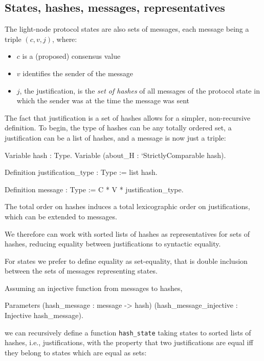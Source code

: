 \subsection{States, hashes, messages, representatives}

The light-node protocol states are also sets of messages,
each message being a triple $(c, v, j)$, where:
\begin{itemize}
    \item $c$ is a (proposed) consensus value
    \item $v$ identifies the sender of the message
    \item $j$, the justification, is the {\em set of hashes} of all messages
        of the protocol state in which the sender was at the time the message
        was sent
\end{itemize}

The fact that justification is a set of hashes allows for a simpler,
non-recursive definition. To begin, the type of hashes can be any
totally ordered set, a justification can be a list of hashes, and
a message is now just a triple:

\begin{coq}
Variable hash : Type.
Variable (about_H : `{StrictlyComparable hash}). 

Definition justification_type : Type := list hash. 

Definition message : Type := C * V * justification_type.
\end{coq}

The total order on hashes induces a total lexicographic order on
justifications, which can be extended to messages.

We therefore can work with sorted lists of hashes as representatives
for sets of hashes, reducing equality between justifications to
syntactic equality.

For states we prefer to define equality as set-equality, that is
double inclusion between the sets of messages representing states.

Assuming an injective function from messages to hashes,
\begin{coq}
Parameters (hash_message : message -> hash)
           (hash_message_injective : Injective hash_message).
\end{coq}    
we can recursively define a function \verb"hash_state" taking 
states to sorted lists of hashes, i.e., justifications, with the
property that two justifications are equal iff they belong to 
states which are equal as sets:

